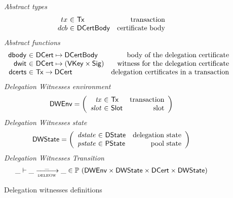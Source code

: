 \begin{figure}
  \emph{Abstract types}
  \begin{equation*}
    \begin{array}{r@{~\in~}lr}
      tx & \Tx & \text{transaction}\\
      dcb & \DCertBody & \text{certificate body}\\
    \end{array}
  \end{equation*}
  \emph{Abstract functions}
  \begin{equation*}
    \begin{array}{r@{~\in~}lr}
      \fun{dbody} & \DCert \mapsto \DCertBody
      & \text{body of the delegation certificate}\\
      \fun{dwit} & \DCert \mapsto (\VKey \times \Sig)
      & \text{witness for the delegation certificate}\\
      \fun{dcerts} & \Tx \to \DCert
      & \text{delegation certificates in a transaction}\\
    \end{array}
  \end{equation*}
  \emph{Delegation Witnesses environment}
  \begin{equation*}
    \DWEnv =
    \left(
      \begin{array}{r@{~\in~}lr}
        \var{tx} & \Tx & \text{transaction}\\
        \var{slot} & \Slot & \text{slot}\\
      \end{array}
    \right)
  \end{equation*}
  \emph{Delegation Witnesses state}
  \begin{equation*}
    \DWState =
    \left(
      \begin{array}{r@{~\in~}lr}
        \var{dstate} & \DState & \text{delegation state}\\
        \var{pstate} & \PState & \text{pool state}\\
      \end{array}
    \right)
  \end{equation*}
  \emph{Delegation Witnesses Transition}
  \begin{equation*}
    \_ \vdash \_ \trans{delegw}{\_} \_ \in
      \powerset (
        \DWEnv \times \DWState \times \DCert \times \DWState)
  \end{equation*}
  \caption{Delegation witnesses definitions}
  \label{fig:defs:delegationw}
\end{figure}


